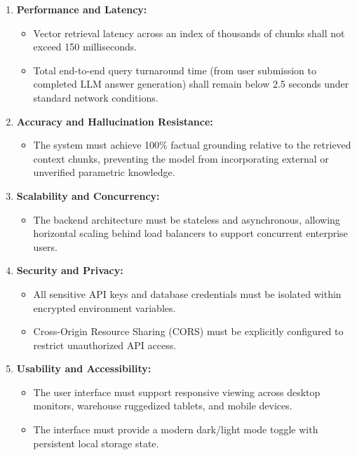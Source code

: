 \begin{enumerate}
    \item \textbf{Performance and Latency:}
    \begin{itemize}
        \item Vector retrieval latency across an index of thousands of chunks shall not exceed 150 milliseconds.
        \item Total end-to-end query turnaround time (from user submission to completed LLM answer generation) shall remain below 2.5 seconds under standard network conditions.
    \end{itemize}
    \item \textbf{Accuracy and Hallucination Resistance:}
    \begin{itemize}
        \item The system must achieve 100\% factual grounding relative to the retrieved context chunks, preventing the model from incorporating external or unverified parametric knowledge.
    \end{itemize}
    \item \textbf{Scalability and Concurrency:}
    \begin{itemize}
        \item The backend architecture must be stateless and asynchronous, allowing horizontal scaling behind load balancers to support concurrent enterprise users.
    \end{itemize}
    \item \textbf{Security and Privacy:}
    \begin{itemize}
        \item All sensitive API keys and database credentials must be isolated within encrypted environment variables.
        \item Cross-Origin Resource Sharing (CORS) must be explicitly configured to restrict unauthorized API access.
    \end{itemize}
    \item \textbf{Usability and Accessibility:}
    \begin{itemize}
        \item The user interface must support responsive viewing across desktop monitors, warehouse ruggedized tablets, and mobile devices.
        \item The interface must provide a modern dark/light mode toggle with persistent local storage state.
    \end{itemize}
\end{enumerate}

